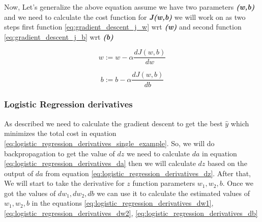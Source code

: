 Now, Let's generalize the above equation assume we have two parameters  \textbf{\textit{(w,b)}} and we need to calculate the cost function for  \textbf{\textit{J(w,b)}} we will work on as two steps first function \eqref{eq:gradient_descent_j_w}  wrt \textbf{\textit{(w)}} and second function \eqref{eq:gradient_descent_j_b} wrt \textbf{\textit{(b)}}

\begin{equation}\label{eq:gradient_descent_j_w}
      w := w - \alpha \frac{dJ(w,b)}{dw}
  \end{equation}

\begin{equation}\label{eq:gradient_descent_j_b}
      b := b - \alpha \frac{dJ(w,b)}{db}
  \end{equation}

\newpage
  \subsubsection{Logistic Regression derivatives}\label{logistic_bp_derivatives}

  As described we need to calculate the gradient descent to get the best $\widehat{y}$ which minimizes the total cost in equation \eqref{eq:logistic_regression_derivatives_single_example}. So, we will do backpropagation to get the value of $dz$ we need to calculate $da$ in equation \eqref{eq:logistic_regression_derivatives_da} then we will calculate $dz$ based on the output of $da$ from equation \eqref{eq:logistic_regression_derivatives_dz}. After that, We will start to take the derivative for $z$ function parameters \textbf{\textit{$w_1,w_2,b$}}. Once we got the values of \textbf{\textit{$dw_1,dw_2,db$}} we can use it to calculate the estimated values of \textbf{\textit{$w_1,w_2,b$}} in the equations \eqref{eq:logistic_regression_derivatives_dw1}, \eqref{eq:logistic_regression_derivatives_dw2}, \eqref{eq:logistic_regression_derivatives_db}

